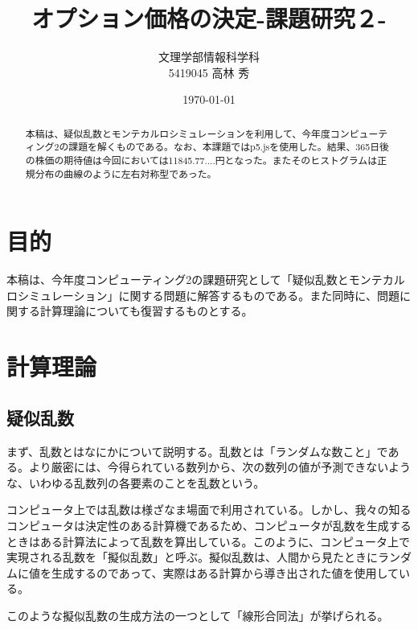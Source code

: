 \documentclass[dvipdfmx]{jsarticle}
\title{オプション価格の決定-課題研究２-}
\author{文理学部情報科学科\\5419045 高林 秀}
\date{\today}
\begin{document}
\maketitle

\begin{abstract}
本稿は、疑似乱数とモンテカルロシミュレーションを利用して、今年度コンピューティング2の課題を解くものである。なお、本課題ではp5.jsを使用した。結果、365日後の株価の期待値は今回においては11845.77....円となった。またそのヒストグラムは正規分布の曲線のように左右対称型であった。
\end{abstract}

\section{目的}
本稿は、今年度コンピューティング2の課題研究として「疑似乱数とモンテカルロシミュレーション」に関する問題に解答するものである。また同時に、問題に関する計算理論についても復習するものとする。
\section{計算理論}
\subsection{疑似乱数}
まず、乱数とはなにかについて説明する。乱数とは「ランダムな数こと」である。より厳密には、今得られている数列から、次の数列の値が予測できないような、いわゆる乱数列の各要素のことを乱数という。\par
コンピュータ上では乱数は様ざなま場面で利用されている。しかし、我々の知るコンピュータは決定性のある計算機であるため、コンピュータが乱数を生成するときはある計算法によって乱数を算出している。このように、コンピュータ上で実現される乱数を「擬似乱数」と呼ぶ。擬似乱数は、人間から見たときにランダムに値を生成するのであって、実際はある計算から導き出された値を使用している。\par
このような擬似乱数の生成方法の一つとして「線形合同法」が挙げられる。
\end{document}
